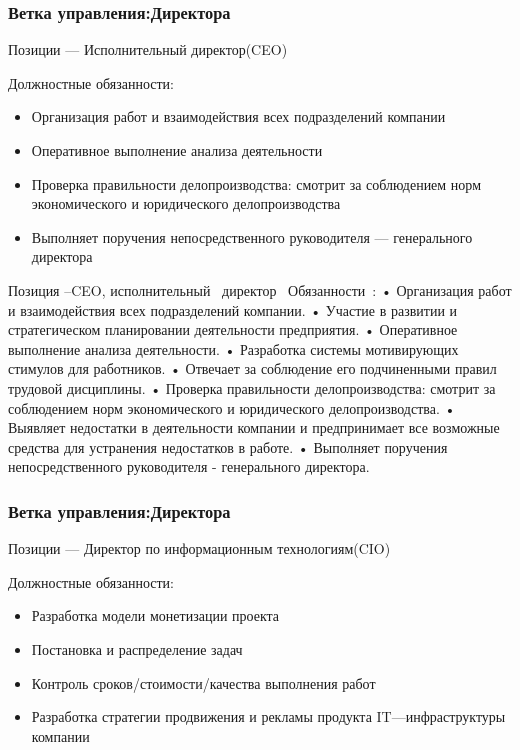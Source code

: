 \documentclass{../industrial-development}
\begin{document}
{\begin{frame} \frametitle{Ветка управления:Директора}
 \begin{block}{}
  \alert{Позиции --- Исполнительный директор(CEO)}

Должностные обязанности: 
  \end{block}
  \begin{itemize}
  \item Организация работ и взаимодействия всех подразделений компании
 \item Оперативное выполнение анализа деятельности
 \item Проверка правильности делопроизводства: смотрит за соблюдением норм экономического и юридического делопроизводства
  \item Выполняет поручения непосредственного руководителя --- генерального директора
  \end{itemize}
\end{frame}

\lecturenotes
Позиция –CEO, исполнительный~\cite{hh} директор~\cite{itcf}
Обязанности~\cite{rab}:
•	Организация работ и взаимодействия всех подразделений компании. 
•	Участие в развитии и стратегическом планировании деятельности предприятия. 
•	Оперативное выполнение анализа деятельности. 
•	Разработка системы мотивирующих стимулов для работников. 
•	Отвечает за соблюдение его подчиненными правил трудовой дисциплины. 
•	Проверка правильности делопроизводства: смотрит за соблюдением норм экономического и юридического делопроизводства.
•	 Выявляет недостатки в деятельности компании и предпринимает все возможные средства для устранения недостатков в работе. 
•	Выполняет поручения непосредственного руководителя - генерального директора. 


\begin{frame} \frametitle{Ветка управления:Директора}
 \begin{block}{}
  \alert{Позиции --- Директор по информационным технологиям(CIO)}

Должностные обязанности: 
  \end{block}
  \begin{itemize}
  \item Разработка модели монетизации проекта
 \item Постановка и распределение задач
\item Контроль сроков/стоимости/качества выполнения работ
 \item Разработка стратегии продвижения и рекламы продукта
   IT---инфраструктуры компании
  \end{itemize}
\end{frame}

}
\end{document}
